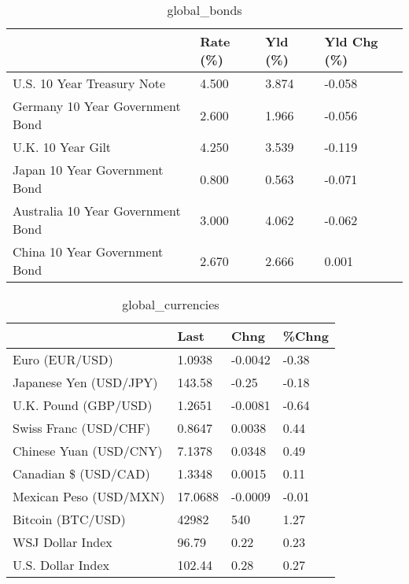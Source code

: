\documentclass{article}%
\begin{document}
%


\begin{table}[htbp]%
\caption{global\_bonds}%
\centering%
\begin{adjustbox}{width=1\textwidth}%
\begin{tabular}{llll}
\toprule
                                  & Rate (\%) & Yld (\%) & Yld Chg (\%) \\
\midrule
       U.S. 10 Year Treasury Note &    4.500 &   3.874 &      -0.058 \\
  Germany 10 Year Government Bond &    2.600 &   1.966 &      -0.056 \\
                U.K. 10 Year Gilt &    4.250 &   3.539 &      -0.119 \\
    Japan 10 Year Government Bond &    0.800 &   0.563 &      -0.071 \\
Australia 10 Year Government Bond &    3.000 &   4.062 &      -0.062 \\
    China 10 Year Government Bond &    2.670 &   2.666 &       0.001 \\
\bottomrule
\end{tabular}
%
\end{adjustbox}%
\end{table}

%


\begin{table}[htbp]%
\caption{global\_currencies}%
\centering%
\begin{adjustbox}{width=1\textwidth}%
\begin{tabular}{llll}
\toprule
                       &    Last &    Chng & \%Chng \\
\midrule
        Euro (EUR/USD) &  1.0938 & -0.0042 & -0.38 \\
Japanese Yen (USD/JPY) &  143.58 &   -0.25 & -0.18 \\
  U.K. Pound (GBP/USD) &  1.2651 & -0.0081 & -0.64 \\
 Swiss Franc (USD/CHF) &  0.8647 &  0.0038 &  0.44 \\
Chinese Yuan (USD/CNY) &  7.1378 &  0.0348 &  0.49 \\
  Canadian \$ (USD/CAD) &  1.3348 &  0.0015 &  0.11 \\
Mexican Peso (USD/MXN) & 17.0688 & -0.0009 & -0.01 \\
     Bitcoin (BTC/USD) &   42982 &     540 &  1.27 \\
      WSJ Dollar Index &   96.79 &    0.22 &  0.23 \\
     U.S. Dollar Index &  102.44 &    0.28 &  0.27 \\
\bottomrule
\end{tabular}
%
\end{adjustbox}%
\end{table}
\end{document}

